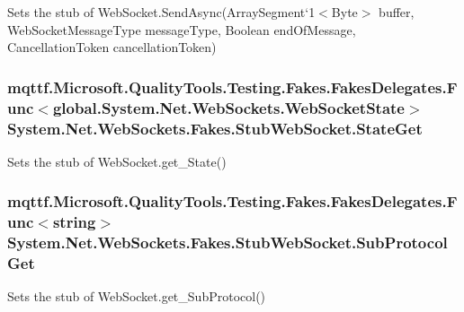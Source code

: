 Sets the stub of Web\-Socket.\-Send\-Async(Array\-Segment`1$<$Byte$>$ buffer, Web\-Socket\-Message\-Type message\-Type, Boolean end\-Of\-Message, Cancellation\-Token cancellation\-Token)

\hypertarget{class_system_1_1_net_1_1_web_sockets_1_1_fakes_1_1_stub_web_socket_a3f61d0ef55d1e5d3d8d92b9e4b73eed4}{
\subsubsection[{State\-Get}]{\setlength{\rightskip}{0pt plus 5cm}mqttf.\-Microsoft.\-Quality\-Tools.\-Testing.\-Fakes.\-Fakes\-Delegates.\-Func$<$global.\-System.\-Net.\-Web\-Sockets.\-Web\-Socket\-State$>$ System.\-Net.\-Web\-Sockets.\-Fakes.\-Stub\-Web\-Socket.\-State\-Get}}\label{class_system_1_1_net_1_1_web_sockets_1_1_fakes_1_1_stub_web_socket_a3f61d0ef55d1e5d3d8d92b9e4b73eed4}


Sets the stub of Web\-Socket.\-get\-\_\-\-State()

\hypertarget{class_system_1_1_net_1_1_web_sockets_1_1_fakes_1_1_stub_web_socket_a3b7e3fb3b4a92e6154262484df5d8eae}{
\subsubsection[{Sub\-Protocol\-Get}]{\setlength{\rightskip}{0pt plus 5cm}mqttf.\-Microsoft.\-Quality\-Tools.\-Testing.\-Fakes.\-Fakes\-Delegates.\-Func$<$string$>$ System.\-Net.\-Web\-Sockets.\-Fakes.\-Stub\-Web\-Socket.\-Sub\-Protocol\-Get}}\label{class_system_1_1_net_1_1_web_sockets_1_1_fakes_1_1_stub_web_socket_a3b7e3fb3b4a92e6154262484df5d8eae}


Sets the stub of Web\-Socket.\-get\-\_\-\-Sub\-Protocol()



